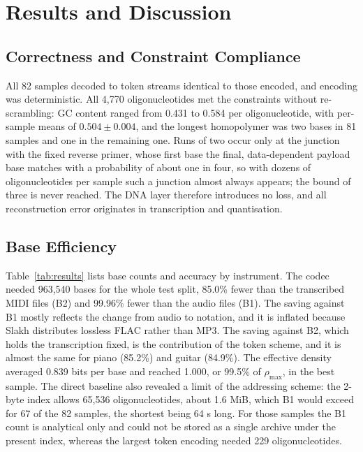 \documentclass[conference]{IEEEtran}
\begin{document}
\section{Results and Discussion}

\subsection{Correctness and Constraint Compliance}

All 82 samples decoded to token streams identical to those encoded, and encoding was deterministic. All 4,770 oligonucleotides met the constraints without re-scrambling: GC content ranged from 0.431 to 0.584 per oligonucleotide, with per-sample means of $0.504 \pm 0.004$, and the longest homopolymer was two bases in 81 samples and one in the remaining one. Runs of two occur only at the junction with the fixed reverse primer, whose first base the final, data-dependent payload base matches with a probability of about one in four, so with dozens of oligonucleotides per sample such a junction almost always appears; the bound of three is never reached. The DNA layer therefore introduces no loss, and all reconstruction error originates in transcription and quantisation.

\subsection{Base Efficiency}

Table~\ref{tab:results} lists base counts and accuracy by instrument. The codec needed 963,540 bases for the whole test split, 85.0\% fewer than the transcribed MIDI files (B2) and 99.96\% fewer than the audio files (B1). The saving against B1 mostly reflects the change from audio to notation, and it is inflated because Slakh distributes lossless FLAC rather than MP3. The saving against B2, which holds the transcription fixed, is the contribution of the token scheme, and it is almost the same for piano (85.2\%) and guitar (84.9\%). The effective density averaged 0.839 bits per base and reached 1.000, or 99.5\% of $\rho_{\max}$, in the best sample. The direct baseline also revealed a limit of the addressing scheme: the 2-byte index allows 65,536 oligonucleotides, about 1.6 MiB, which B1 would exceed for 67 of the 82 samples, the shortest being 64 s long. For those samples the B1 count is analytical only and could not be stored as a single archive under the present index, whereas the largest token encoding needed 229 oligonucleotides.
\end{document}
